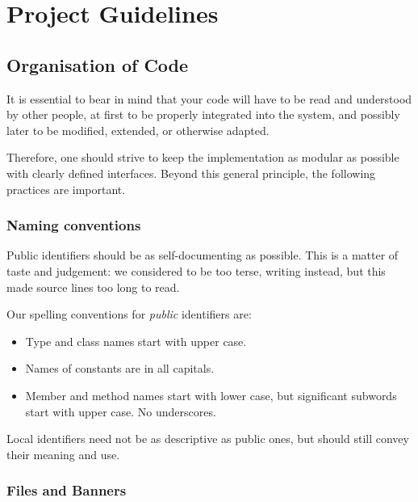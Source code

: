 

\chapter{Project Guidelines}

\section{Organisation of Code}

It is essential to bear in mind that your code will have to be read
and understood by other people, at first to be properly integrated into
the system, and possibly later to be modified, extended, or otherwise
adapted.

Therefore, one should strive to keep the implementation as modular as
possible with clearly defined interfaces. Beyond this general
principle, the following practices are important.

\subsection{Naming conventions}

Public identifiers should be as self-documenting as possible.  This is a
matter of taste and judgement: we considered  to be too
terse, writing  instead, but this made
source lines too long to read.

Our spelling conventions for {\em public} identifiers are:

\begin{itemize}
\item
Type and class names start with upper case.
\item
Names of constants are in all capitals.
\item
Member and method names start with lower case, but significant subwords
start with upper case. No underscores.
\end{itemize}

Local identifiers need not be as descriptive as public ones, but
should still convey their meaning and use.

\subsection{Files and Banners}

